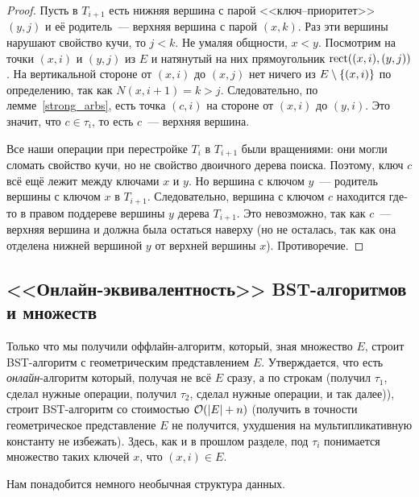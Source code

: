 \begin{proof}
	Пусть в $T_{i + 1}$ есть нижняя вершина с парой <<ключ--приоритет>> $(y, j)$ и её родитель~--- верхняя вершина с парой $(x, k)$. Раз эти вершины нарушают свойство кучи, то $j < k$.
	Не умаляя общности, $x < y$. Посмотрим на точки $(x, i)$ и $(y, j)$ из $E$ и натянутый на них прямоугольник $\operatorname{rect}((x, i), (y, j))$. На вертикальной стороне от $(x, i)$ до $(x, j)$ нет ничего из $E \setminus \lbrace(x, i)\rbrace$ по определению, так как $N(x, i + 1) = k > j$. Следовательно, по лемме~\ref{strong_arbs}, есть точка $(c, i)$ на
	стороне от $(x, i)$ до $(y, i)$. Это значит, что $c \in \tau_i$, то есть $c$~--- верхняя вершина.

	Все наши операции при перестройке $T_i$ в $T_{i + 1}$ были вращениями: они могли сломать свойство кучи, но не свойство двоичного дерева поиска. Поэтому, ключ $c$ всё ещё лежит между ключами $x$ и $y$. Но вершина с ключом $y$~--- родитель вершины с ключом $x$ в $T_{i + 1}$. Следовательно, вершина с ключом $c$ находится где-то в правом поддереве вершины $y$ дерева $T_{i + 1}$. Это невозможно, так как $c$~--- верхняя вершина и должна была остаться наверху (но не осталась, так как она отделена нижней вершиной $y$ от верхней вершины $x$). Противоречие.
\end{proof}

\subsection{<<Онлайн-эквивалентность>> BST-алгоритмов и \arbs множеств}

Только что мы получили оффлайн-алгоритм, который, зная \arbs множество $E$, строит BST-алгоритм с геометрическим представлением $E$. Утверждается, что есть \emph{онлайн}-алгоритм который, получая не всё $E$ сразу, а по строкам (получил $\tau_1$, сделал нужные операции, получил $\tau_2$, сделал нужные операции, и так далее)), строит BST-алгоритм со стоимостью $\mathcal{O}(\lvert E\rvert + n)$
(получить в точности геометрическое представление $E$ не получится, ухудшения на мультипликативную константу не избежать). Здесь, как и в прошлом разделе, под $\tau_i$
понимается множество таких ключей $x$, что $(x, i) \in E$.

Нам понадобится немного необычная структура данных.

